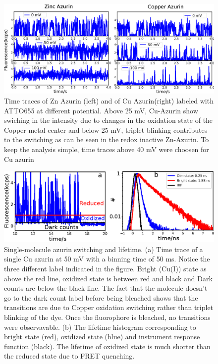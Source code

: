 \documentclass[11pt,a4paper,onecolumn]{article}
\begin{document}
\begin{figure}
  \centering
  \includegraphics[width=\textwidth,keepaspectratio]{SI_timetrace_Zn_Cu.eps}
  \makeatletter
  \renewcommand{\fnum@figure}{\figurename~S\thefigure}
  \makeatother
  \caption{Time traces of Zn Azurin (left) and of Cu Azurin(right) labeled with ATTO655 at different potential.  Above 25 mV, Cu-Azurin show swiching in the intensity due to changes in the oxidation state of the Copper metal center and below 25 mV, triplet blinking contributes to the switching as can be seen in the redox inactive Zn-Azurin. To keep the analysis simple, time traces above 40 mV were choosen for Cu azurin}
  \label{SIfig:tracecomparision}
\end{figure}
\begin{figure}
  \centering
  \includegraphics{lifetime.eps}
  \makeatletter
  \renewcommand{\fnum@figure}{\figurename~S\thefigure}
  \makeatother
  \caption{Single-molecule azurin switching and lifetime. (a) Time trace of a single Cu azurin at 50 mV with a binning time of 50 ms. Notice the three different label indicated in the figure. Bright (Cu(I)) state as above the red line, oxidized state is between red and black and Dark counts are below the black line. The fact that the molecule doesn't go to the dark count label before being bleached shows that the transitions are due to Copper oxidation switching rather than triplet blinking of the dye. Once the fluorophore is bleached, no transitions were observavable. (b) The lifetime histogram corresponding to bright state (red), oxidized state (blue) and instrument response function (black). The lifetime of oxidized state is much shorter than the reduced state due to FRET quenching.}
  \label{SIfig: lifetime}
\end{figure}
\end{document}
